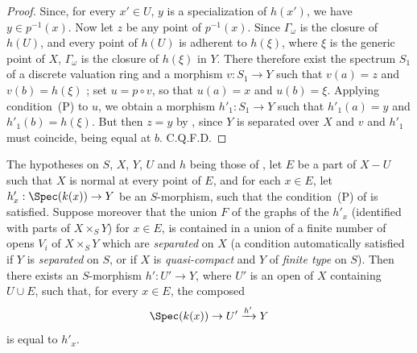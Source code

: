 \begin{proof}
Since, for every $x'\in U$, $y$ is a specialization of $h(x')$, we have $y\in p^{-1}(x)$.
Now let $z$ be any point of $p^{-1}(x)$.
Since $\Gamma_\omega$ is the closure of $h(U)$, and every point of $h(U)$ is adherent to $h(\xi)$, where $\xi$ is the generic point of $X$, $\Gamma_\omega$ is the closure of $h(\xi)$ in $Y$.
There therefore exist the spectrum $S_1$ of a discrete valuation ring and a morphism $v:S_1\to Y$ such that $v(a)=z$ and $v(b)=h(\xi)$ ;
set $u=p\circ v$, so that $u(a)=x$ and $u(b)=\xi$.
Applying condition~(P) to $u$, we obtain a morphism $h'_1:S_1\to Y$ such that $h'_1(a)=y$ and $h'_1(b)=h(\xi)$.
But then $z=y$ by , since $Y$ is separated over $X$ and $v$ and $h'_1$ must coincide, being equal at $b$.
C.Q.F.D.
\end{proof}

\begin{corollary}[20.4.7]
\label{IV.20.4.7}
The hypotheses on $S$, $X$, $Y$, $U$ and $h$ being those of , let $E$ be a part of $X-U$ such that $X$ is normal at every point of $E$, and for each $x\in E$, let $h'_x:\Spec(k(x))\to Y$ be an $S$-morphism, such that the condition~(P) of  is satisfied.
Suppose moreover that the union $F$ of the graphs of the $h'_x$ (identified with parts of $X\times_S Y$) for $x\in E$, is contained in a union of a finite number of opens $V_i$ of $X\times_S Y$ which are \emph{separated} on $X$ (a condition automatically satisfied if $Y$ is \emph{separated} on $S$, or if $X$ is \emph{quasi-compact} and $Y$ of \emph{finite type} on $S$).
Then there exists an $S$-morphism $h':U'\to Y$, where $U'$ is an open of $X$ containing $U\cup E$, such that, for every $x\in E$, the composed
\[
  \Spec(k(x))\to U'\xrightarrow{h'}Y
\]
is equal to $h'_x$.
\end{corollary}

